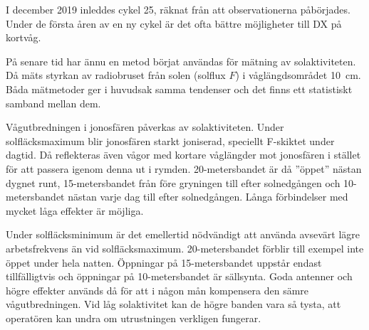 I december 2019 inleddes cykel 25, räknat från att observationerna påbörjades.
Under de första åren av en ny cykel är det ofta bättre möjligheter till DX på
kortvåg.

På senare tid har ännu en metod börjat användas för mätning av solaktiviteten.
Då mäts styrkan av radiobruset från solen (solflux \(F\)) i våglängdsområdet
\SI{10}{\centi\metre}.
Båda mätmetoder ger i huvudsak samma tendenser och det finns ett
statistiskt samband mellan dem.

Vågutbredningen i jonosfären påverkas av solaktiviteten.
Under solfläcksmaximum blir jonosfären starkt joniserad, speciellt F-skiktet
under dagtid.
Då reflekteras även vågor med kortare våglängder mot jonosfären i stället för
att passera igenom denna ut i rymden.
20-metersbandet är då ''öppet'' nästan dygnet runt, 15-metersbandet från före
gryningen till efter solnedgången och 10-metersbandet nästan varje dag till
efter solnedgången.
Långa förbindelser med mycket låga effekter är möjliga.

Under solfläcksminimum är det emellertid nödvändigt att använda avsevärt lägre
arbetsfrekvens än vid solfläcksmaximum.
20-metersbandet förblir till exempel inte öppet under hela natten.
Öppningar på 15-metersbandet uppstår endast tillfälligtvis och öppningar på
10-metersbandet är sällsynta.
Goda antenner och högre effekter används då för att i någon mån kompensera den
sämre vågutbredningen.
Vid låg solaktivitet kan de högre banden vara så tysta, att operatören kan
undra om utrustningen verkligen fungerar.
